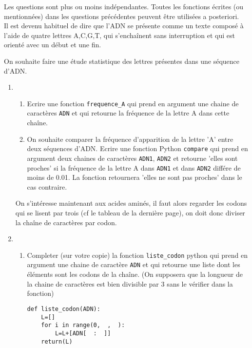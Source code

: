 \documentclass[a4paper, 11pt,reqno]{article}
\begin{document}
\begin{exercice}[Informatique]
Les questions sont plus ou moins indépendantes. Toutes les fonctions écrites (ou mentionnées) dans les questions précédentes peuvent être utilisées a posteriori. \\


Il est devenu habituel de dire que l'ADN se présente comme un texte composé à l'aide de quatre lettres A,C,G,T, qui s'enchaînent sans interruption et qui est orienté avec un début et une fin. 


On souhaite faire une étude statistique des lettres présentes dans une séquence d'ADN. 
\begin{enumerate}
\item \begin{enumerate}


\item Ecrire une fonction \texttt{frequence\_A} qui prend en argument une chaine de caractères \texttt{ADN}  et qui retourne la fréquence de la lettre A dans cette chaîne. 

\item On souhaite comparer la fréquence d'apparition de la lettre 'A' entre deux séquences d'ADN. Ecrire une fonction Python \texttt{compare} qui prend en argument deux chaines de caractères \texttt{ADN1}, \texttt{ADN2} et retourne 'elles sont proches' si la fréquence de la lettre A dans \texttt{ADN1} et dans \texttt{ADN2} différe de moins de 0.01. La fonction retournera 'elles ne sont pas proches' dans le cas contraire. \\
\end{enumerate}

On s'intéresse maintenant aux acides aminés, il faut alors regarder les codons qui se lisent par trois (cf le tableau de la dernière page), on doit donc diviser la chaîne de caractères par codon. 

\item
\begin{enumerate}
\item Completer (sur votre copie) la fonction \texttt{liste\_codon}  python qui prend en argument une chaine de caractère \texttt{ADN} et qui  retourne une liste dont les éléments sont les codons de la chaîne. (On supposera que la longueur de la chaine de caractères est bien divisible par 3 sans le vérifier dans la fonction) 
\begin{lstlisting}
def liste_codon(ADN):
    L=[]
    for i in range(0,  ,  ):
        L=L+[ADN[  :  ]]
    return(L)
\end{lstlisting}


\end{enumerate}
\end{enumerate}
\end{exercice}
\end{document}
